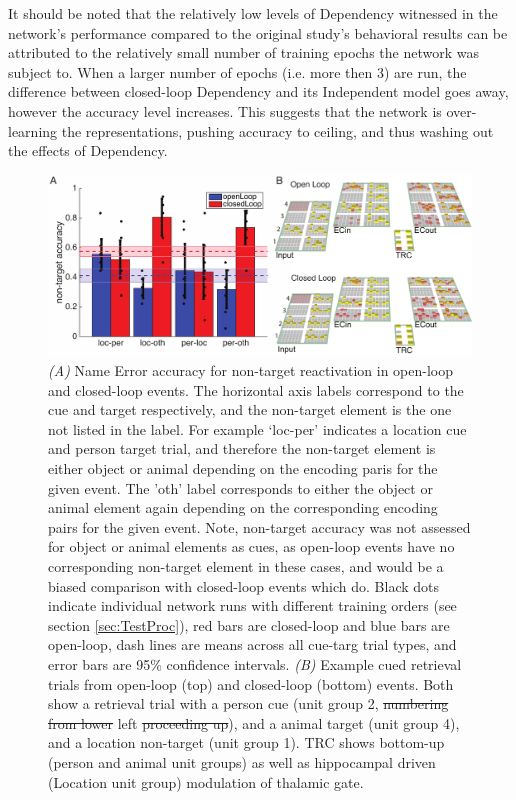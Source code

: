 \documentclass[11pt, titlepage, twoside]{article}
\providecommand{\DIFadd}[1]{{\protect\color{blue}\uwave{#1}}} %
\providecommand{\DIFdel}[1]{{\protect\color{red}\sout{#1}}}                      %
\providecommand{\DIFaddFL}[1]{\DIFadd{#1}} %
\providecommand{\DIFdelFL}[1]{\DIFdel{#1}} %
\providecommand{\DIFaddbeginFL}{} %
\providecommand{\DIFaddendFL}{} %
\providecommand{\DIFdelbeginFL}{} %
\providecommand{\DIFdelendFL}{} %
\begin{document}
It should be noted that the relatively low levels of Dependency witnessed in the network's performance compared to the original study's behavioral results %
can be attributed to the relatively small number of training epochs the network was subject to.  When a larger number of epochs (i.e. more then 3) are run, the difference between closed-loop Dependency and its Independent model goes away, however the accuracy level increases.  This suggests that the network is over-learning the representations, pushing accuracy to ceiling, and thus washing out the effects of Dependency.



\begin{figure}
    \begin{center}
	\DIFdelbeginFL %
\DIFdelendFL \DIFaddbeginFL \includegraphics[width=\textwidth]{figs/depNonTarg_edit.pdf}
    \DIFaddendFL \end{center}
      \caption[Non Target Reactivation]{
       \emph{(A)} Name Error accuracy for non-target reactivation in open-loop and closed-loop events.  The horizontal axis labels correspond to the cue and target respectively, and the non-target element is the one not listed in the label.  For example `loc-per' indicates a location cue and person target trial, and therefore the non-target element is either object or animal depending on the encoding paris for the given event.  The 'oth' label corresponds to either the object or animal element again depending on the corresponding encoding pairs for the given event.  Note, non-target accuracy was not assessed for object or animal elements as cues, as open-loop events have no corresponding non-target element in these cases, and would be a biased comparison with closed-loop events which do. Black dots indicate individual network runs with different training orders (see section \ref{sec:TestProc}), red bars are closed-loop and blue bars are open-loop, dash lines are means across all cue-targ trial types, and error bars are 95\% confidence intervals. \emph{(B)} Example cued retrieval trials from open-loop (top) and closed-loop (bottom) events.  Both show a retrieval trial with a person cue (unit group 2, \DIFdelbeginFL \DIFdelFL{numbering from lower }\DIFdelendFL \DIFaddbeginFL \DIFaddFL{as numbered to the }\DIFaddendFL left \DIFdelbeginFL \DIFdelFL{proceeding up}\DIFdelendFL \DIFaddbeginFL \DIFaddFL{of the Input layers}\DIFaddendFL ), and a animal target (unit group 4), and a location non-target (unit group 1).  TRC shows bottom-up (person and animal unit groups) as well as hippocampal driven (Location unit group) modulation of thalamic gate.
}
\end{figure}
\end{document}
